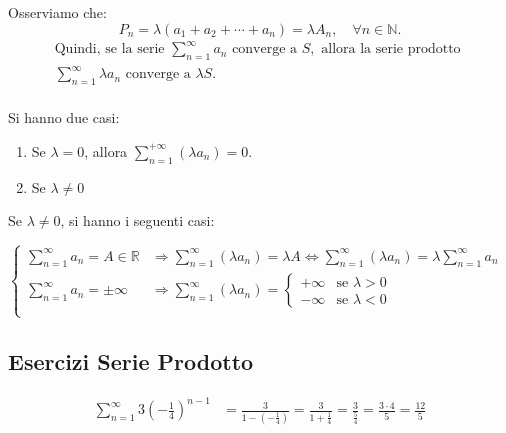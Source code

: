 \documentclass{article}
\begin{document}
Osserviamo che:
\[
    P_n = \lambda \left(a_1 + a_2 + \cdots + a_n\right) = \lambda A_n, \quad \forall n \in \mathbb{N}.
\]
\begin{align*}
    \text{Quindi, se la serie } \sum_{n=1}^{\infty} a_n \text{ converge a } S, \text{ allora la serie prodotto } \\ \sum_{n=1}^{\infty} \lambda a_n \text{ converge a } \lambda S. \\
\end{align*}

Si hanno due casi:
\begin{enumerate}
    \item Se $\lambda = 0$, allora $\sum_{n=1}^{+\infty} \left( \lambda a_n \right) = 0$.
    \item Se $\lambda \neq 0$
\end{enumerate}

Se $\lambda \neq 0$, si hanno i seguenti casi:

$
\begin{cases}
    \sum_{n=1}^{\infty} a_n = A \in \mathbb{R} & \Rightarrow \sum_{n=1}^{\infty} \left( \lambda a_n \right) = \lambda A \Leftrightarrow \sum_{n=1}^{\infty} \left( \lambda a_n \right) = \lambda \sum_{n=1}^{\infty} a_n \\
    \sum_{n=1}^{\infty} a_n = \pm\infty & \Rightarrow \sum_{n=1}^{\infty} \left( \lambda a_n \right) = 
    \begin{cases}
        +\infty & \text{se } \lambda > 0 \\
        -\infty & \text{se } \lambda < 0
    \end{cases} 
    \\
\end{cases} $

\subsection*{Esercizi Serie Prodotto}
\begin{align*}
    \sum_{n=1}^{\infty} 3 \left(-\frac{1}{4}\right)^{n-1} &= \frac{3}{1 - \left( -\frac{1}{4}\right)} = \frac{3}{1 + \frac{1}{4}} = \frac{3}{\frac{5}{4}} = \frac{3 \cdot 4}{5} = \frac{12}{5}
\end{align*}
\end{document}
